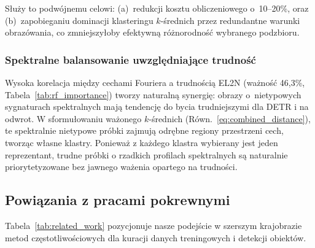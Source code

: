Służy to podwójnemu celowi: (a)~redukcji kosztu obliczeniowego o~10--20\%,
oraz (b)~zapobieganiu dominacji klasteringu $k$-średnich przez redundantne
warunki obrazówania, co zmniejszyłoby efektywną różnorodność wybranego
podzbioru.

\subsubsection{Spektralne balansowanie uwzględniające trudność}

Wysoka korelacja między cechami Fouriera a trudnością EL2N (ważność 46{,}3\%,
Tabela~\ref{tab:rf_importance}) tworzy naturalną synergię: obrazy
o~nietypowych sygnaturach spektralnych mają tendencję do bycia trudniejszymi
dla DETR i na odwrot.  W sformułowaniu ważonego $k$-średnich
(Równ.~\ref{eq:combined_distance}), te spektralnie nietypowe próbki zajmują
odrębne regiony przestrzeni cech, tworząc własne klastry.  Ponieważ z każdego
klastra wybierany jest jeden reprezentant, trudne próbki o rzadkich profilach
spektralnych są naturalnie priorytetyzowane bez jawnego ważenia opartego na
trudności.


\subsection{Powiązania z pracami pokrewnymi}
\label{sec:fourier_connections}

Tabela~\ref{tab:related_work} pozycjonuje nasze podejście w szerszym
krajobrazie metod częstotliwościowych dla kuracji danych treningowych
i detekcji obiektów.

